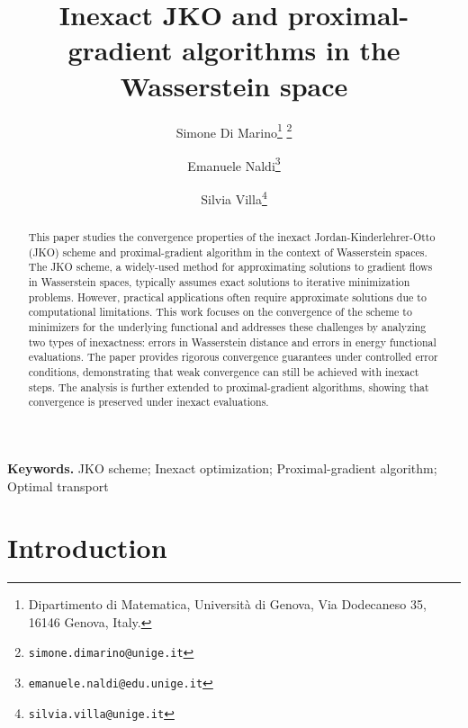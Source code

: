 \documentclass[11pt]{article}
\title{\textbf{Inexact JKO and proximal-gradient algorithms in the Wasserstein space}}
\author{
	Simone Di Marino\thanks{Dipartimento di Matematica, Università di Genova, Via Dodecaneso 35, 16146 Genova, Italy.}
	\thanks{\texttt{simone.dimarino@unige.it}} \and
	Emanuele Naldi\footnotemark[1]
	\thanks{\texttt{emanuele.naldi@edu.unige.it}} \and
	Silvia Villa\footnotemark[1]
	\thanks{\texttt{silvia.villa@unige.it}}
}
\date{}
\numberwithin{equation}{section}
\begin{document}
	\maketitle
	
\begin{abstract}
	This paper studies the convergence properties of the inexact Jordan-Kinderlehrer-Otto (JKO) scheme and proximal-gradient algorithm in the context of Wasserstein spaces. The JKO scheme, a widely-used method for approximating solutions to gradient flows in Wasserstein spaces, typically assumes exact solutions to iterative minimization problems. However, practical applications often require approximate solutions due to computational limitations. This work focuses on the convergence of the scheme to minimizers for the underlying functional and addresses these challenges by analyzing two types of inexactness: errors in Wasserstein distance and errors in energy functional evaluations. The paper provides rigorous convergence guarantees under controlled error conditions, demonstrating that weak convergence can still be achieved with inexact steps. The analysis is further extended to proximal-gradient algorithms, showing that convergence is preserved under inexact evaluations.
\end{abstract}	

\noindent \textbf{Keywords.} JKO scheme; Inexact optimization; Proximal-gradient algorithm; Optimal transport

\section{Introduction}
\end{document}
